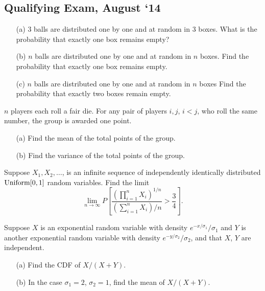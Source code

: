 \subsection{Qualifying Exam, August `14}
\begin{problem}
  \hfill
  \begin{itemize}[noitemsep]
  \item[(a)] \(3\) balls are distributed one by one and at random in \(3\)
    boxes. What is the probability that exactly one box remains empty?
  \item[(b)] \(n\) balls are distributed one by one and at random in \(n\)
    boxes. Find the probability that exactly one box remains empty.
  \item[(c)] \(n\) balls are distributed one by one and at random in \(n\)
    boxes Find the probability that exactly two boxes remain empty.
  \end{itemize}
\end{problem}
\begin{solution}
\end{solution}

\begin{problem}
  \(n\) players each roll a fair die. For any pair of players \(i,j\),
  \(i<j\), who roll the same number, the group is awarded one point.
  \begin{itemize}[noitemsep]
  \item[(a)] Find the mean of the total points of the group.
  \item[(b)] Find the variance of the total points of the group.
  \end{itemize}
\end{problem}
\begin{solution}
\end{solution}

\begin{problem}
  Suppose \(X_1,X_2,\dotsc\), is an infinite sequence of independently
  identically distributed \(\operatorname{Uniform}[0,1]\) random variables. Find the
  limit
  \[
    \lim_{n\to\infty} P%
    \left[%
      \frac{\left(\prod_{i=1}^n X_i\right)^{1/n}}
      {\left(\sum_{i=1}^nX_i\right)/n}>\frac{3}{4}%
    \right].
  \]
\end{problem}
\begin{solution}
\end{solution}

\begin{problem}
  Suppose \(X\) is an exponential random variable with density
  \(e^{-x/\sigma_1}/\sigma_1\) and \(Y\) is another exponential random
  variable with density \(e^{-y/\sigma_2}/\sigma_2\), and that \(X\), \(Y\)
  are independent.
  \begin{itemize}[noitemsep]
  \item[(a)] Find the CDF of \(X/(X+Y)\).
  \item[(b)] In the case \(\sigma_1=2\), \(\sigma_2=1\), find the mean of
    \(X/(X+Y)\).
  \end{itemize}
\end{problem}
\begin{solution}
\end{solution}

